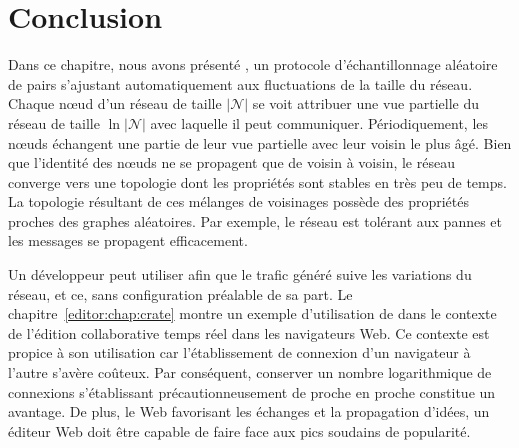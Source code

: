 
\section{Conclusion}
\label{net:sec:conclusion}

Dans ce chapitre, nous avons présenté \SPRAY, un protocole d'échantillonnage
aléatoire de pairs s'ajustant automatiquement aux fluctuations de la taille du
réseau. Chaque nœud d'un réseau de taille $|\mathcal{N}|$ se voit attribuer une
vue partielle du réseau de taille $\ln |\mathcal{N}|$ avec laquelle il peut
communiquer. Périodiquement, les nœuds échangent une partie de leur vue
partielle avec leur voisin le plus âgé. Bien que l'identité des nœuds ne se
propagent que de voisin à voisin, le réseau converge vers une topologie dont les
propriétés sont stables en très peu de temps. La topologie résultant de ces
mélanges de voisinages possède des propriétés proches des graphes
aléatoires. Par exemple, le réseau est tolérant aux pannes et les messages se
propagent efficacement.

Un développeur peut utiliser \SPRAY afin que le trafic généré suive les
variations du réseau, et ce, sans configuration préalable de sa part. Le
chapitre~\ref{editor:chap:crate} montre un exemple d'utilisation de \SPRAY dans
le contexte de l'édition collaborative temps réel dans les navigateurs Web.  Ce
contexte est propice à son utilisation car l'établissement de connexion d'un
navigateur à l'autre s'avère coûteux. Par conséquent, conserver un nombre
logarithmique de connexions s'établissant précautionneusement de proche en
proche constitue un avantage. De plus, le Web favorisant les échanges et la
propagation d'idées, un éditeur Web doit être capable de faire face aux pics
soudains de popularité.


